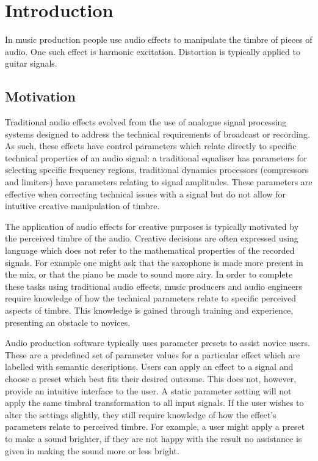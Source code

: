 \chapter{Introduction}
\label{chap:Introduction}
	\note
	{
		In music production people use audio effects to manipulate the timbre of pieces of audio. One such effect is
		harmonic excitation. Distortion is typically applied to guitar signals.
	}

\section{Motivation}
\label{sec:Introduction-Motivation}
	Traditional audio effects evolved from the use of analogue signal processing systems designed to address the
	technical requirements of broadcast or recording. As such, these effects have control parameters which relate
	directly to specific technical properties of an audio signal: a traditional equaliser has parameters for selecting
	specific frequency regions, traditional dynamics processors (compressors and limiters) have parameters relating to
	signal amplitudes. These parameters are effective when correcting technical issues with a signal but do not allow
	for intuitive creative manipulation of timbre.

	The application of audio effects for creative purposes is typically motivated by the perceived timbre of the audio.
	Creative decisions are often expressed using language which does not refer to the mathematical properties of the
	recorded signals. For example one might ask that the saxophone is made more present in the mix, or that the piano be
	made to sound more airy. In order to complete these tasks using traditional audio effects, music producers and audio
	engineers require knowledge of how the technical parameters relate to specific perceived aspects of timbre. This
	knowledge is gained through training and experience, presenting an obstacle to novices.

	Audio production software typically uses parameter presets to assist novice users. These are a predefined set of
	parameter values for a particular effect which are labelled with semantic descriptions. Users can apply an effect to
	a signal and choose a preset which best fits their desired outcome. This does not, however, provide an intuitive
	interface to the user. A static parameter setting will not apply the same timbral transformation to all input
	signals. If the user wishes to alter the settings slightly, they still require knowledge of how the effect's
	parameters relate to perceived timbre. For example, a user might apply a preset to make a sound brighter, if they
	are not happy with the result no assistance is given in making the sound more or less bright.

